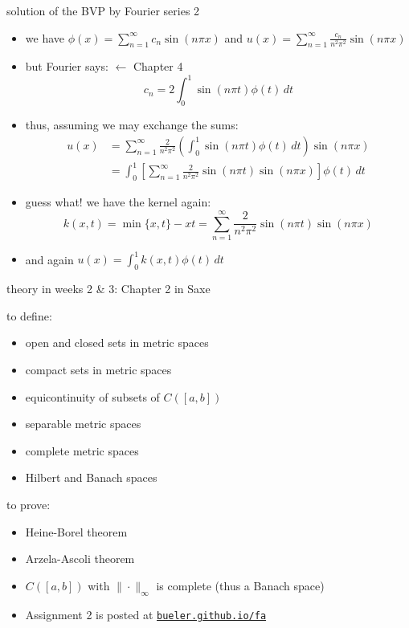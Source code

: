 \documentclass[10pt,
               svgnames,
               hyperref={colorlinks,
                         citecolor=DeepPink4,
                         linkcolor=FireBrick,
                         urlcolor=Maroon},
               usepdftitle=false]{beamer}
\begin{document}
\begin{frame}{solution of the BVP by Fourier series 2}

\begin{itemize}
\item we have $\phi(x) = \sum_{n=1}^\infty c_n \sin(n\pi x)$ and $u(x) = \sum_{n=1}^\infty \frac{c_n}{n^2 \pi^2} \sin(n\pi x)$
\item but Fourier says: \hfill {\footnotesize $\longleftarrow$ Chapter 4}
	$$c_n = 2 \int_0^1 \sin(n\pi t) \phi(t) \,dt$$
\item thus, assuming we may exchange the sums:
\begin{align*}
u(x) &= \sum_{n=1}^\infty \frac{2}{n^2 \pi^2} \left(\int_0^1 \sin(n\pi t) \phi(t) \,dt\right) \sin(n\pi x) \\
&= \int_0^1 \left[\sum_{n=1}^\infty \frac{2}{n^2 \pi^2} \sin(n\pi t) \sin(n\pi x)\right] \phi(t) \,dt
\end{align*}
\item guess what!  we have the kernel again:
	$$k(x,t) = \min\{x,t\} - xt = \sum_{n=1}^\infty \frac{2}{n^2 \pi^2} \sin(n\pi t) \sin(n\pi x)$$
\item and again $u(x) = \int_0^1 k(x,t)\phi(t)\, dt$
\end{itemize}
\end{frame}


\begin{frame}{theory in weeks 2 \& 3: Chapter 2 in Saxe}

\begin{block}{to define:}
\begin{itemize}
\item open and closed sets in metric spaces
\item compact sets in metric spaces
\item equicontinuity of subsets of $C([a,b])$
\item separable metric spaces
\item complete metric spaces
\item Hilbert and Banach spaces
\end{itemize}
\end{block}

\begin{block}{to prove:}
\begin{itemize}
\item Heine-Borel theorem
\item Arzela-Ascoli theorem
\item $C([a,b])$ with $\|\cdot\|_\infty$ is complete (thus a Banach space)
\end{itemize}
\end{block}

\begin{itemize}
\item Assignment 2 is posted at \quad  \href{https://bueler.github.io/fa/index.html}{\texttt{bueler.github.io/fa}}
\end{itemize}
\end{frame}
\end{document}
